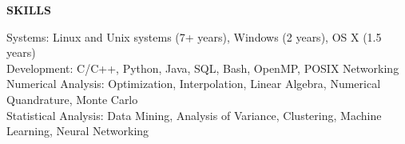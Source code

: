 \textbf{SKILLS} \\
\vspace{5pt}

Systems: Linux and Unix systems (7+ years), Windows (2 years), OS X (1.5 years) \\
\vspace{2pt}
Development: C/C++, Python, Java, SQL, Bash, OpenMP, POSIX Networking \\
\vspace{2pt}
Numerical Analysis: Optimization, Interpolation, Linear Algebra, Numerical Quandrature, Monte Carlo \\
\vspace{2pt}
Statistical Analysis: Data Mining, Analysis of Variance, Clustering, Machine Learning, Neural Networking \\
\vspace{2pt}
